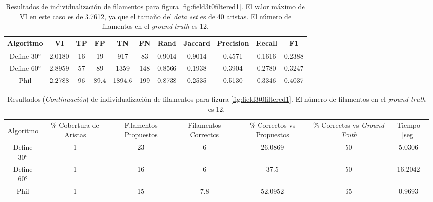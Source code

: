 




\begin{table}[h]
    \centering
    \begin{tabular}{|c|c|c|c|c|c|c|c|c|c|c|}
    \hline
        Algoritmo & VI & TP & FP &TN &FN & Rand	& Jaccard &	Precision &	Recall &	F1 \\ \hline
        Define 30° & 2.0180 & 16 & 19 & 917 & 83 & 0.9014 & 0.9014 & 0.4571 & 0.1616 & 0.2388\\
        Define 60° &  2.8959 & 57 & 89 & 1359 & 148 & 0.8566 & 0.1938 & 0.3904 & 0.2780 & 0.3247\\ 
        Phil & 2.2788 & 96 & 89.4 & 1894.6 & 199 & 0.8738 & 0.2535 & 0.5130 & 0.3346 & 0.4037 \\
        \hline
    \end{tabular}
    \caption{Resultados de individualizaci\'on de filamentos para figura \ref{fig:field3t0filtered1}. El valor m\'aximo de VI en este caso es de 3.7612, ya que el tama\~no del {\it data set} es de 40 aristas. El n\'umero de filamentos en el {\it ground truth} es 12.}
    \label{tab:field3t0filtered1}
\end{table}
\addtocounter{table}{-1}
\begin{table}[h]
    \centering
    \begin{tabular}{|c|c|c|c|c|c|c|}
    \hline
         & \multirow{4}{2cm}{\centering \% Cobertura de Aristas} & \multirow{4}{2cm}{Filamentos Propuestos} & \multirow{4}{2cm}{Filamentos Correctos} & \multirow{4}{2.5cm}{\% Correctos vs Propuestos} & \multirow{4}{2.5cm}{\centering \% Correctos vs {\it Ground Truth}} & \multirow{4}{1.2cm}{\centering Tiempo [seg]} \\
         &  &  &  & & &  \\
        Algoritmo &  &  &  & & &  \\
        &  &  &  & & &  \\ \hline
        Define 30° &  1 & 23 & 6 & 26.0869 & 50 & 5.0306 \\
        Define 60° &  1 & 16 & 6 & 37.5 & 50 & 16.2042\\ 
        Phil &  1 & 15 & 7.8 & 52.0952 & 65 & 0.9693 \\
        \hline
    \end{tabular}
    \caption{Resultados ({\it Continuaci\'on}) de individualizaci\'on de filamentos para figura \ref{fig:field3t0filtered1}. El n\'umero de filamentos en el {\it ground truth} es 12.}
\end{table}


